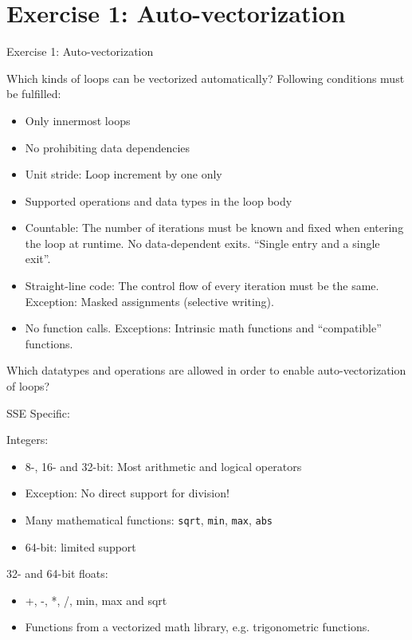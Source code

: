 \section{Exercise 1: Auto-vectorization}

\begin{frame}{}
\begin{center}
{\Huge Exercise 1: Auto-vectorization}
\end{center}
\end{frame}

\begin{frame}{Which kinds of loops can be vectorized automatically?}
Following conditions must be fulfilled:
\begin{itemize}
\item Only innermost loops
\item No prohibiting data dependencies
\item Unit stride: Loop increment by one only
\item Supported operations and data types in the loop body
\item Countable: The number of iterations must be known and fixed when entering the loop at runtime. No data-dependent exits. \enquote{Single entry and a single exit}.
\item Straight-line code: The control flow of every iteration must be the same. Exception: Masked assignments (selective writing).
\item No function calls. Exceptions: Intrinsic math functions and \enquote{compatible} functions.
\end{itemize}
\end{frame}

\begin{frame}{Which datatypes and operations are allowed in order to enable auto-vectorization of loops?}
\begin{center}
\begin{Large}
SSE Specific:
\end{Large}
\end{center}

Integers:
\begin{itemize}
	\item 8-, 16- and 32-bit: Most arithmetic and logical operators
	\item Exception: No direct support for division!
	\item Many mathematical functions: \texttt{sqrt}, \texttt{min}, \texttt{max}, \texttt{abs}
	\item 64-bit: limited support
\end{itemize}
32- and 64-bit floats: 
\begin{itemize}
	\item +, -, *, /, min, max and sqrt
	\item Functions from a vectorized math library, e.g. trigonometric functions.
\end{itemize}
\end{frame}

